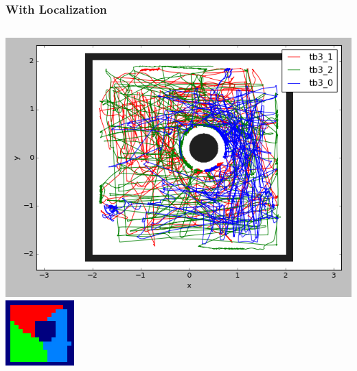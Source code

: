 \documentclass{beamer}
\begin{document}
    \begin{frame}
        \frametitle{With Localization}
        \begin{columns}
        \includegraphics[width=\columnwidth]{dec_with_lo.png}
        \includegraphics[width=\columnwidth]{or5.png}
        \end{columns}
    \end{frame}
    
\end{document}
